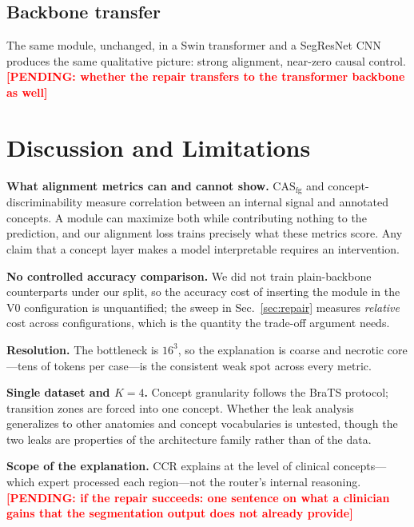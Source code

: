 \documentclass[runningheads]{llncs}
\newcommand{\casfg}{\mathrm{CAS}_{\mathrm{fg}}}
\newcounter{pend}
\newcommand{\pending}[1]{\stepcounter{pend}\textcolor{red}{\textbf{[PENDING: #1]}}}
\begin{document}
\subsection{Backbone transfer}
The same module, unchanged, in a Swin transformer and a SegResNet CNN produces the same
qualitative picture: strong alignment, near-zero causal control. \pending{whether the repair
transfers to the transformer backbone as well}

\section{Discussion and Limitations}\label{sec:limitations}
\textbf{What alignment metrics can and cannot show.} $\casfg$ and concept-discriminability
measure correlation between an internal signal and annotated concepts. A module can maximize
both while contributing nothing to the prediction, and our alignment loss trains precisely what
these metrics score. Any claim that a concept layer makes a model interpretable requires an
intervention.

\textbf{No controlled accuracy comparison.} We did not train plain-backbone counterparts under
our split, so the accuracy cost of inserting the module in the V0 configuration is unquantified;
the sweep in Sec.~\ref{sec:repair} measures \emph{relative} cost across configurations, which is
the quantity the trade-off argument needs.

\textbf{Resolution.} The bottleneck is $16^3$, so the explanation is coarse and necrotic
core---tens of tokens per case---is the consistent weak spot across every metric.

\textbf{Single dataset and $K{=}4$.} Concept granularity follows the BraTS protocol; transition
zones are forced into one concept. Whether the leak analysis generalizes to other anatomies and
concept vocabularies is untested, though the two leaks are properties of the architecture family
rather than of the data.

\textbf{Scope of the explanation.} CCR explains at the level of clinical concepts---which expert
processed each region---not the router's internal reasoning. \pending{if the repair succeeds:
one sentence on what a clinician gains that the segmentation output does not already provide}

\end{document}
